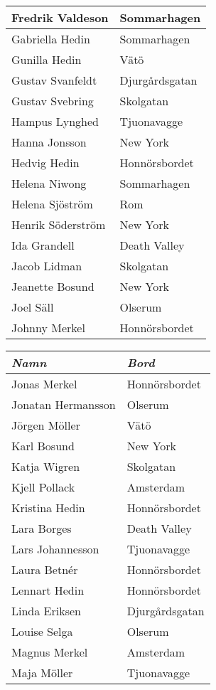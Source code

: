 \documentclass[12.0pt]{extarticle}
\begin{document}
\begin{center}
\begin{tabular}{l  l}
Fredrik Valdeson	&	Sommarhagen	\\ \hline
Gabriella Hedin	&	Sommarhagen	\\ \hline
Gunilla Hedin	&	Vätö	\\ \hline
Gustav Svanfeldt	&	Djurgårdsgatan	\\ \hline
Gustav Svebring	&	Skolgatan	\\ \hline
Hampus Lynghed	&	Tjuonavagge	\\ \hline
Hanna Jonsson	&	New York	\\ \hline
Hedvig Hedin	&	Honnörsbordet	\\ \hline
Helena Niwong	&	Sommarhagen	\\ \hline
Helena Sjöström	&	Rom	\\ \hline
Henrik Söderström	&	New York	\\ \hline
Ida Grandell	&	Death Valley	\\ \hline
Jacob Lidman	&	Skolgatan	\\ \hline
Jeanette Bosund	&	New York	\\ \hline
Joel Säll	&	Olserum	\\ \hline
Johnny Merkel	&	Honnörsbordet	\\ \hline
\end{tabular}
\hspace{2cm}
\begin{tabular}{l l}
\textbf{\textit{Namn}}	&	\textbf{\textit{Bord}} \\ \hline
Jonas Merkel	&	Honnörsbordet	\\ \hline
Jonatan Hermansson	&	Olserum	\\ \hline
Jörgen Möller	&	Vätö	\\ \hline
Karl Bosund	&	New York	\\ \hline
Katja Wigren	&	Skolgatan	\\ \hline
Kjell Pollack	&	Amsterdam	\\ \hline
Kristina Hedin	&	Honnörsbordet	\\ \hline
Lara Borges	&	Death Valley	\\ \hline
Lars Johannesson	&	Tjuonavagge	\\ \hline
Laura Betnér	&	Honnörsbordet	\\ \hline
Lennart Hedin	&	Honnörsbordet	\\ \hline
Linda Eriksen	&	Djurgårdsgatan	\\ \hline
Louise Selga	&	Olserum	\\ \hline
Magnus Merkel	&	Amsterdam	\\ \hline
Maja Möller	&	Tjuonavagge	\\ \hline

\end{tabular}
\end{center}
\end{document}
